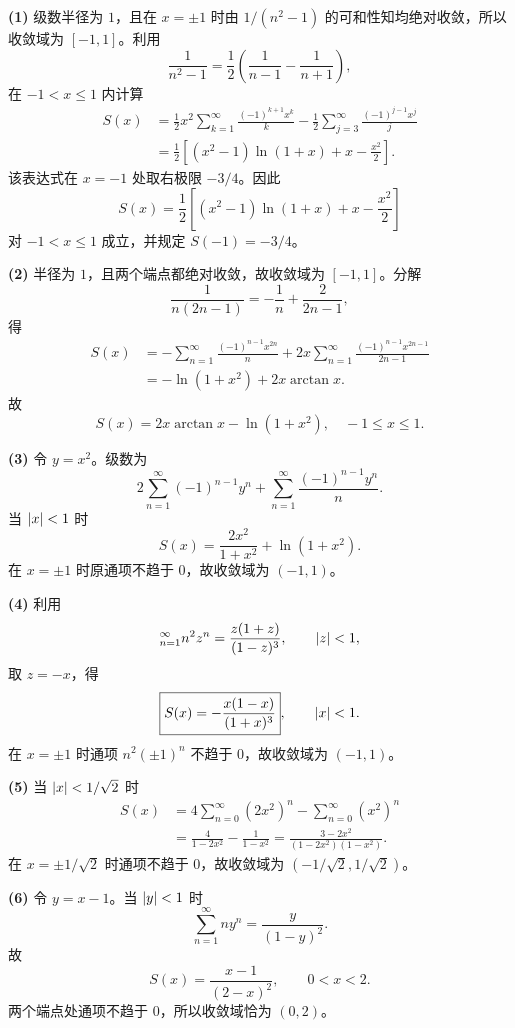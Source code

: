 \begin{xsolution}
\textbf{(1)} 级数半径为 $1$，且在 $x=\pm1$ 时由 $1/(n^2-1)$ 的可和性知均绝对收敛，所以收敛域为 $[-1,1]$。利用
\[
  \frac1{n^2-1}=\frac12\left(\frac1{n-1}-\frac1{n+1}\right),
\]
在 $-1<x\leqslant1$ 内计算
\[
\begin{aligned}
  S(x)
  &=\frac12x^2\sum_{k=1}^{\infty}\frac{(-1)^{k+1}x^k}{k}
   -\frac12\sum_{j=3}^{\infty}\frac{(-1)^{j-1}x^j}{j}\\
  &=\frac12\left[(x^2-1)\ln(1+x)+x-\frac{x^2}{2}\right].
\end{aligned}
\]
该表达式在 $x=-1$ 处取右极限 $-3/4$。因此
\[
  \boxed{S(x)=\frac12\left[(x^2-1)\ln(1+x)+x-\frac{x^2}{2}\right]}
\]
对 $-1<x\leqslant1$ 成立，并规定 $S(-1)=-3/4$。

\textbf{(2)} 半径为 $1$，且两个端点都绝对收敛，故收敛域为 $[-1,1]$。分解
\[
  \frac1{n(2n-1)}=-\frac1n+\frac2{2n-1},
\]
得
\[
\begin{aligned}
  S(x)
  &=-\sum_{n=1}^{\infty}\frac{(-1)^{n-1}x^{2n}}n
  +2x\sum_{n=1}^{\infty}\frac{(-1)^{n-1}x^{2n-1}}{2n-1}\\
  &=-\ln(1+x^2)+2x\arctan x.
\end{aligned}
\]
故
\[
  \boxed{S(x)=2x\arctan x-\ln(1+x^2),\quad -1\leqslant x\leqslant1}.
\]

\textbf{(3)} 令 $y=x^2$。级数为
\[
  2\sum_{n=1}^{\infty}(-1)^{n-1}y^n
  +\sum_{n=1}^{\infty}\frac{(-1)^{n-1}y^n}{n}.
\]
当 $\lvert x\rvert<1$ 时
\[
  \boxed{S(x)=\frac{2x^2}{1+x^2}+\ln(1+x^2)}.
\]
在 $x=\pm1$ 时原通项不趋于 $0$，故收敛域为 $(-1,1)$。

\textbf{(4)} 利用
\[
  \relax_{n=1}^{\infty}n^2z^n=\frac{z(1+z)}{(1-z)^3},\qquad \lvert z\rvert<1,
\]
取 $z=-x$，得
\[
  \boxed{S(x)=-\frac{x(1-x)}{(1+x)^3}},\qquad \lvert x\rvert<1.
\]
在 $x=\pm1$ 时通项 $n^2(\pm1)^n$ 不趋于 $0$，故收敛域为 $(-1,1)$。

\textbf{(5)} 当 $\lvert x\rvert<1/\sqrt2$ 时
\[
\begin{aligned}
  S(x)
  &=4\sum_{n=0}^{\infty}(2x^2)^n-\sum_{n=0}^{\infty}(x^2)^n\\
  &=\frac4{1-2x^2}-\frac1{1-x^2}
  =\boxed{\frac{3-2x^2}{(1-2x^2)(1-x^2)}}.
\end{aligned}
\]
在 $x=\pm1/\sqrt2$ 时通项不趋于 $0$，故收敛域为 $(-1/\sqrt2,1/\sqrt2)$。

\textbf{(6)} 令 $y=x-1$。当 $\lvert y\rvert<1$ 时
\[
  \sum_{n=1}^{\infty}ny^n=\frac{y}{(1-y)^2}.
\]
故
\[
  \boxed{S(x)=\frac{x-1}{(2-x)^2}},
  \qquad 0<x<2.
\]
两个端点处通项不趋于 $0$，所以收敛域恰为 $(0,2)$。
\end{xsolution}


